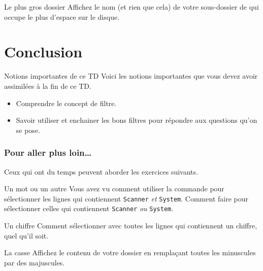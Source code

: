 \documentclass[a4paper,11pt]{style-esi/td}
\begin{document}
		\begin{Exemple}{Le plus gros dossier}
			Affichez le nom (et rien que cela)
			de votre sous-dossier de 
			qui occupe le plus d'espace sur le disque.
		\end{Exemple}

\section{Conclusion}

	\begin{theorie}{Notions importantes de ce TD}
		Voici les notions importantes que vous devez avoir assimilées à la fin de ce TD.
		\begin{itemize}
		\item Comprendre le concept de filtre.
		\item Savoir utiliser et enchainer les bons filtres pour répondre
			aux questions qu'on se pose.
		\end{itemize}
	\end{theorie}

	\subsubsection*{Pour aller plus loin\dots}
	Ceux qui ont du temps peuvent aborder les exercices suivants.
	
	\begin{Exercice}{Un mot ou un autre}
		Vous avez vu comment utiliser la commande 
		pour sélectionner les lignes qui con\-tien\-nent \verb_Scanner_
		\emph{et} \verb_System_.
		Comment faire pour sélectionner celles qui con\-tien\-nent
		\verb_Scanner_ \emph{ou} \verb_System_.
	\end{Exercice}
	
	\begin{Exercice}{Un chiffre}
		Comment sélectionner avec \samp{grep}
		toutes les lignes qui con\-tien\-nent un chiffre, quel qu'il soit.
	\end{Exercice}

	\begin{Exercice}{La casse}
		Affichez le contenu de votre dossier en remplaçant
		toutes les minuscules par des ma\-jus\-cu\-les. 
	\end{Exercice}
\end{document}
